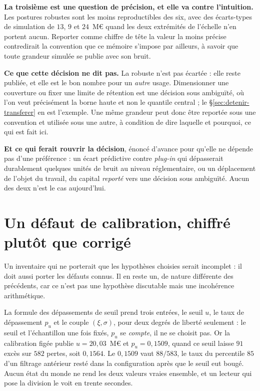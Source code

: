 \textbf{La troisième est une question de précision, et elle va contre l'intuition.} Les postures
robustes sont les moins reproductibles des six, avec des écarts-types de simulation de $13$, $9$
et $24$~M\euro{} quand les deux extrémités de l'échelle n'en portent aucun. Reporter comme chiffre
de tête la valeur la moins précise contredirait la convention que ce mémoire s'impose par ailleurs,
à savoir que toute grandeur simulée se publie avec son bruit.

\begin{attention}
\textbf{Ce que cette décision ne dit pas.} La robuste n'est pas écartée : elle reste publiée, et
elle est le bon nombre pour un \emph{autre} usage. Dimensionner une couverture ou fixer une limite
de rétention est une décision sous ambiguïté, où l'on veut précisément la borne haute et non le
quantile central ; le \S\ref{sec:detenir-transferer} en est l'exemple. Une même grandeur peut donc
être reportée sous une convention et utilisée sous une autre, à condition de dire laquelle et
pourquoi, ce qui est fait ici.

\textbf{Et ce qui ferait rouvrir la décision}, énoncé d'avance pour qu'elle ne dépende pas d'une
préférence : un écart prédictive contre \emph{plug-in} qui dépasserait durablement quelques unités
de bruit au niveau réglementaire, ou un déplacement de l'objet du travail, du capital
\emph{reporté} vers une décision sous ambiguïté. Aucun des deux n'est le cas aujourd'hui.
\end{attention}

\section{Un défaut de calibration, chiffré plutôt que corrigé}
\label{sec:pu-coherence}

Un inventaire qui ne porterait que les hypothèses choisies serait incomplet : il doit aussi
porter les défauts connus. Il en reste un, de nature différente des précédents, car ce n'est
pas une hypothèse discutable mais une incohérence arithmétique.

La formule des dépassements de seuil prend trois entrées, le seuil $u$, le taux de dépassement
$p_u$ et le couple $(\xi,\sigma)$, pour deux degrés de liberté seulement : le seuil et
l'échantillon une fois fixés, $p_u$ se \emph{compte}, il ne se choisit pas. Or la calibration
figée publie $u=20{,}03$~M\euro{} et $p_u=0{,}1509$, quand ce seuil laisse $91$ excès sur $582$
pertes, soit $0{,}1564$. Le $0{,}1509$ vaut $88/583$, le taux du percentile $85$ d'un filtrage
antérieur resté dans la configuration après que le seuil eut bougé. Aucun état du monde ne rend
les deux valeurs vraies ensemble, et un lecteur qui pose la division le voit en trente secondes.

